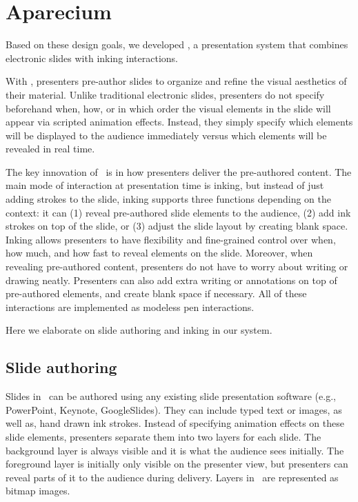 \section{Aparecium}

Based on these design goals, we developed \interface, a presentation system that combines electronic slides with inking interactions. 

With \interface, presenters pre-author slides to organize and refine the visual aesthetics of their material.
%
Unlike traditional electronic slides, presenters do not specify beforehand when, how, or in which order the visual elements in the slide will appear via scripted animation effects. Instead, they simply specify which elements will be displayed to the audience immediately versus which elements will be revealed in real time. 

The key innovation of \interface\ is in how presenters deliver the pre-authored content.  The main mode of interaction at presentation time is inking, but instead of just adding strokes to the slide, inking supports three functions depending on the context: it can (1) reveal pre-authored slide elements to the audience, (2) add ink strokes on top of the slide, or (3) adjust the slide layout by creating blank space. Inking allows presenters to have flexibility and fine-grained control over when, how much, and how fast to reveal elements on the slide.
%
Moreover, when revealing pre-authored content, presenters do not have to worry about writing or drawing neatly.
%
Presenters can also add extra writing or annotations on top of pre-authored elements, and create blank space if necessary. 
%
All of these interactions are implemented as modeless pen interactions.

Here we elaborate on slide authoring and inking in our system.

\subsection{Slide authoring}
Slides in \interface\ can be authored using any existing slide presentation software (e.g., PowerPoint, Keynote, GoogleSlides). They can include typed text or images, as well as, hand drawn ink strokes. Instead of specifying animation effects on these slide elements, presenters separate them into two layers for each slide. The background layer is always visible and it is what the audience sees initially. The foreground layer is initially only visible on the presenter view, but presenters can reveal parts of it to the audience during delivery.  Layers in \interface\ are represented as bitmap images. 

